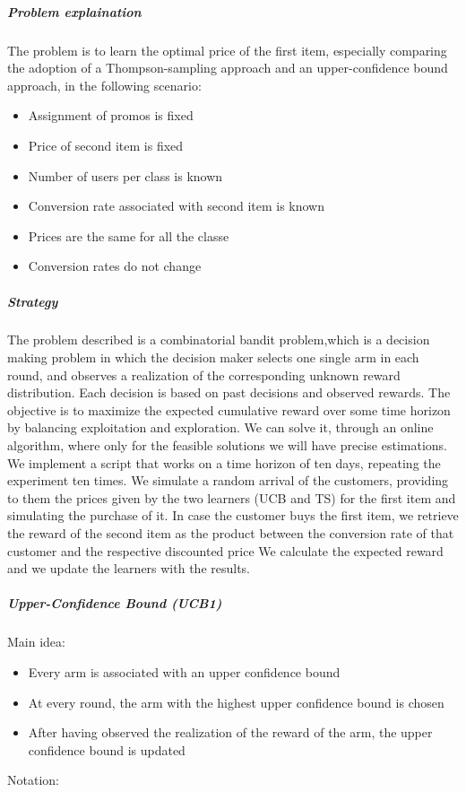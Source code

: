 \subparagraph*{Problem explaination}
The problem is to learn the optimal price of the first item, especially comparing the adoption of a Thompson-sampling approach and an upper-confidence bound approach, in the following scenario:
\begin{itemize}
	\item Assignment of promos is fixed
	\item Price of second item is fixed
	\item Number of users per class is known
	\item Conversion rate associated with second item is known
	\item Prices are the same for all the classe
	\item Conversion rates do not change
\end{itemize}
\subparagraph*{Strategy}
The problem described is a combinatorial bandit problem,which is a decision making problem in which the decision maker selects one single arm in each round, and observes a realization of the corresponding unknown reward distribution. Each decision is based on past decisions and observed rewards. The objective is to maximize the expected cumulative reward over some time horizon by balancing exploitation and exploration. We can solve it, through an online algorithm, where only for the feasible solutions we will have precise estimations. We implement a script that works on a time horizon of ten days, repeating the experiment ten times. We simulate a random arrival of the customers, providing to them the prices given by the two learners (UCB and TS) for the first item and simulating the purchase of it. In case the customer buys the first item, we retrieve the reward of the second item as the product  between the conversion rate of that customer and the respective discounted price  We calculate the expected reward and we update the learners with the results. 
\subparagraph*{Upper-Confidence Bound (UCB1)}
Main idea:
\begin{itemize}
	\item Every arm is associated with an upper confidence bound 
	\item At every round, the arm with the highest upper confidence bound is chosen
	\item After having observed the realization of the reward of the arm, the upper confidence bound is updated
\end{itemize}
Notation:\\
